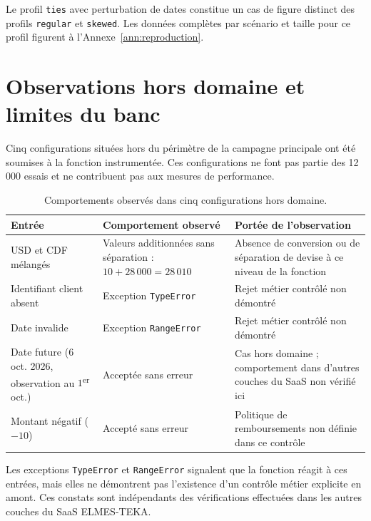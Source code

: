 Le profil \texttt{ties} avec perturbation de dates constitue un cas de figure distinct des
profils \texttt{regular} et \texttt{skewed}. Les données complètes par scénario et taille
pour ce profil figurent à l'Annexe~\ref{ann:reproduction}.

\section{Observations hors domaine et limites du banc}
\label{sec:resultats-hors-domaine}

Cinq configurations situées hors du périmètre de la campagne principale ont été soumises à
la fonction instrumentée. Ces configurations ne font pas partie des 12\,000 essais et ne
contribuent pas aux mesures de performance.

\begin{table}[htb]
  \centering
  \caption{Comportements observés dans cinq configurations hors domaine.}
  \label{tab:resultats-hors-domaine}
  \begin{tabular}{p{}p{}p{}}
    \toprule
    Entrée & Comportement observé & Portée de l'observation \\
    \midrule
    USD et CDF mélangés
      & Valeurs additionnées sans séparation : $10 + 28\,000 = 28\,010$
      & Absence de conversion ou de séparation de devise à ce niveau de la fonction \\
    Identifiant client absent
      & Exception \texttt{TypeError}
      & Rejet métier contrôlé non démontré \\
    Date invalide
      & Exception \texttt{RangeError}
      & Rejet métier contrôlé non démontré \\
    Date future ($6$ oct. 2026, observation au $1$\textsuperscript{er} oct.)
      & Acceptée sans erreur
      & Cas hors domaine ; comportement dans d'autres couches du SaaS non vérifié ici \\
    Montant négatif ($-10$)
      & Accepté sans erreur
      & Politique de remboursements non définie dans ce contrôle \\
    \bottomrule
  \end{tabular}
\end{table}

Les exceptions \texttt{TypeError} et \texttt{RangeError} signalent que la fonction réagit
à ces entrées, mais elles ne démontrent pas l'existence d'un contrôle métier explicite en
amont. Ces constats sont indépendants des vérifications effectuées dans les autres couches
du SaaS ELMES-TEKA.

